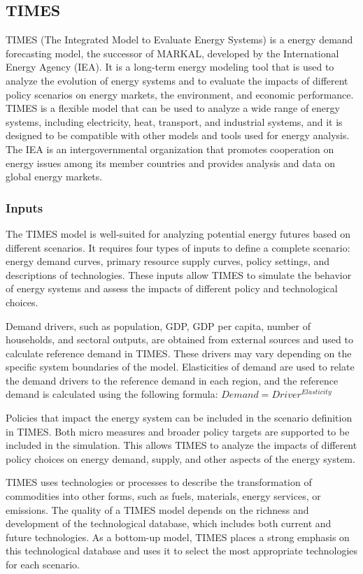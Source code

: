 \documentclass[lettersize,journal]{IEEEtran}
\begin{document}
  \subsection{TIMES}
  TIMES (The Integrated Model to Evaluate Energy Systems) is a energy demand forecasting model, the successor of MARKAL, developed by the International Energy Agency (IEA). It is a long-term energy modeling tool that is used to analyze the evolution of energy systems and to evaluate the impacts of different policy scenarios on energy markets, the environment, and economic performance. TIMES is a flexible model that can be used to analyze a wide range of energy systems, including electricity, heat, transport, and industrial systems, and it is designed to be compatible with other models and tools used for energy analysis. The IEA is an intergovernmental organization that promotes cooperation on energy issues among its member countries and provides analysis and data on global energy markets.

  \subsubsection{Inputs}
  The TIMES model is well-suited for analyzing potential energy futures based on different scenarios. It requires four types of inputs to define a complete scenario: energy demand curves, primary resource supply curves, policy settings, and descriptions of technologies. These inputs allow TIMES to simulate the behavior of energy systems and assess the impacts of different policy and technological choices.

  Demand drivers, such as population, GDP, GDP per capita, number of households, and sectoral outputs, are obtained from external sources and used to calculate reference demand in TIMES. These drivers may vary depending on the specific system boundaries of the model. Elasticities of demand are used to relate the demand drivers to the reference demand in each region, and the reference demand is calculated using the following formula:
  $Demand=Driver^{Elasticity}$

  Policies that impact the energy system can be included in the scenario definition in TIMES. Both micro measures and broader policy targets are supported to be included in the simulation. This allows TIMES to analyze the impacts of different policy choices on energy demand, supply, and other aspects of the energy system.

  TIMES uses technologies or processes to describe the transformation of commodities into other forms, such as fuels, materials, energy services, or emissions. The quality of a TIMES model depends on the richness and development of the technological database, which includes both current and future technologies. As a bottom-up model, TIMES places a strong emphasis on this technological database and uses it to select the most appropriate technologies for each scenario.
\end{document}

